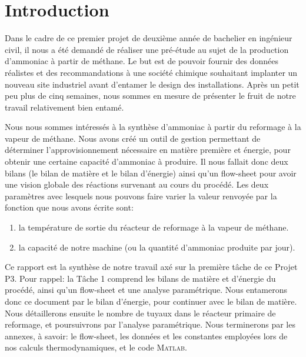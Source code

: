 \section{Introduction}

Dans le cadre de ce premier projet de deuxième année de bachelier en ingénieur civil, il nous a été demandé
de réaliser une pré-étude au sujet de la production d'ammoniac à partir de méthane. Le but est de pouvoir fournir
des données réalistes et des recommandations à une société chimique souhaitant implanter un nouveau site industriel
avant d’entamer le design des installations. Après un petit peu plus de cinq semaines, nous sommes en
mesure de présenter le fruit de notre travail relativement bien entamé. 

Nous nous sommes intéressés à la synthèse d’ammoniac à partir du reformage à la vapeur de méthane. Nous avons
créé un outil de gestion permettant de déterminer l’approvisionnement nécessaire en matière première et énergie, pour
obtenir une certaine capacité d'ammoniac à produire. Il nous fallait donc deux bilans (le bilan de matière et le
bilan d'énergie) ainsi qu'un flow-sheet pour avoir une vision globale des réactions survenant au cours du procédé. Les
deux paramètres avec lesquels nous pouvons faire varier la valeur renvoyée par la fonction que nous avons écrite sont:

\begin{enumerate}
\item la température de sortie du réacteur de reformage à la vapeur de méthane.
\item la capacité de notre machine (ou la quantité d'ammoniac  produite par jour).
\end{enumerate}


Ce rapport est la synthèse de notre travail axé sur la première tâche de ce Projet P3. Pour rappel: la Tâche 1 comprend
les bilans de matière et d’énergie du procédé, ainsi qu'un flow-sheet et une analyse paramétrique. Nous entamerons donc ce
document par le bilan d'énergie, pour continuer avec le bilan de matière. Nous détaillerons ensuite le nombre de tuyaux
dans le réacteur primaire de reformage, et poursuivrons par l'analyse paramétrique. Nous terminerons par les annexes, à
savoir: le flow-sheet, les données et les constantes employées lors de nos calculs thermodynamiques, et le code \textsc{Matlab}.		
